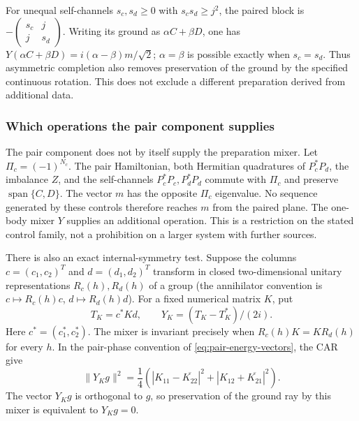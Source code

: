 \documentclass[11pt,reqno]{scrartcl}
\DeclareMathOperator{\Span}{span}
\theoremstyle{plain}
\theoremstyle{definition}
\theoremstyle{remark}
\begin{document}
For unequal self-channels $s_c,s_d\geq0$ with $s_cs_d\geq j^2$,
the paired block is $-\left(\begin{smallmatrix}s_c&j\\j&s_d\end{smallmatrix}\right)$.
Writing its ground as $\alpha C+\beta D$, one has
$Y(\alpha C+\beta D)=i(\alpha-\beta)m/\sqrt2$; $\alpha=\beta$ is possible exactly when
$s_c=s_d$.  Thus asymmetric completion also removes preservation of
the ground by the specified continuous rotation.  This does not exclude
a different preparation derived from additional data.

\subsubsection*{Which operations the pair component supplies}

The pair component does not by itself supply the preparation mixer.
Let $\Pi_c=(-1)^{N_c}$.  The pair Hamiltonian, both Hermitian
quadratures of $P_c^*P_d$, the imbalance $Z$, and the self-channels
$P_c^*P_c,P_d^*P_d$ commute with $\Pi_c$ and preserve
$\Span\{C,D\}$.  The vector $m$ has the opposite $\Pi_c$ eigenvalue.
No sequence generated by these controls therefore reaches $m$ from
the paired plane.  The one-body mixer $Y$ supplies an additional
operation.  This is a restriction on the stated control family,
not a prohibition on a larger system with further sources.

There is also an exact internal-symmetry test.  Suppose the columns
$c=(c_1,c_2)^T$ and $d=(d_1,d_2)^T$ transform in closed two-dimensional
unitary representations $R_c(h),R_d(h)$ of a group (the annihilator
convention is $c\mapsto R_c(h)c$, $d\mapsto R_d(h)d$).  For a fixed
numerical matrix $K$, put
\begin{equation}
 T_K=c^*Kd,\qquad Y_K=(T_K-T_K^*)/(2i).
 \label{eq:pair-general-mixer}
\end{equation}
Here $c^*=(c_1^*,c_2^*)$.  The mixer is invariant precisely when
$R_c(h)K=KR_d(h)$ for every $h$.  In the pair-phase convention
of \eqref{eq:pair-energy-vectors}, the CAR give
\begin{equation}
 \|Y_Kg\|^2
 =\frac14\left(
 |K_{11}-\overline{K_{22}}|^2+
 |K_{12}+\overline{K_{21}}|^2\right).
 \label{eq:pair-mixer-ground-certificate}
\end{equation}
The vector $Y_Kg$ is orthogonal to $g$, so preservation of the ground
ray by this mixer is equivalent to $Y_Kg=0$.
\end{document}
